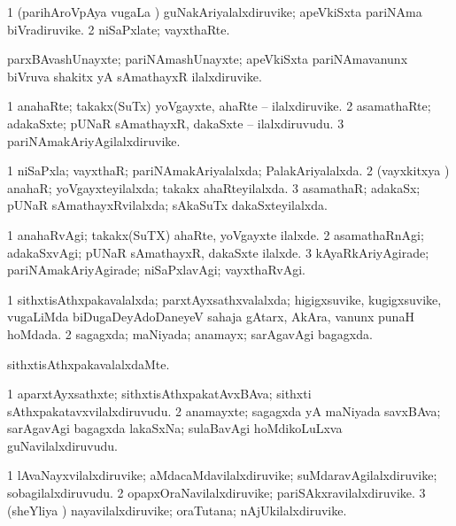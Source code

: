 \bentry
{}
\gl{\nA}
\bmng
\bnum
\num{1} (parihAroVpAya \mo vugaLa \vi) guNakAriyalalxdiruvike; apeVkiSxta pariNAma biVradiruvike. 
\num{2} niSaPxlate; vayxthaRte. 
\enum
\emng
\eentry

\bentry
{}
\gl{\nA}
\bmng
parxBAvashUnayxte; pariNAmashUnayxte; apeVkiSxta pariNAmavanunx biVruva shakitx yA sAmathayxR ilalxdiruvike. 
\emng
\eentry

\bentry
{}
\gl{\nA}
\bmng
\bnum
\num{1} anahaRte; takakx(SuTx) yoVgayxte, ahaRte -- ilalxdiruvike. 
\num{2} asamathaRte; adakaSxte; pUNaR sAmathayxR, dakaSxte -- ilalxdiruvudu. 
\num{3} pariNAmakAriyAgilalxdiruvike. 
\enum
\emng
\eentry

\bentry
{}
\gl{\gu}
\bmng
\bnum
\num{1} niSaPxla; vayxthaR; pariNAmakAriyalalxda; PalakAriyalalxda. 
\num{2} (vayxkitxya \vi) anahaR; yoVgayxteyilalxda; takakx ahaRteyilalxda. 
\num{3} asamathaR; adakaSx; pUNaR sAmathayxRvilalxda; sAkaSuTx dakaSxteyilalxda. 
\enum
\emng
\eentry

\bentry
{}
\gl{\kirxvi}
\bmng
\bnum
\num{1} anahaRvAgi; takakx(SuTX) ahaRte, yoVgayxte ilalxde. 
\num{2} asamathaRnAgi; adakaSxvAgi; pUNaR sAmathayxR, dakaSxte ilalxde. 
\num{3} kAyaRkAriyAgirade; pariNAmakAriyAgirade; niSaPxlavAgi; vayxthaRvAgi. 
\enum
\emng
\eentry

\bentry
{}
\gl{\gu}
\bmng
\bnum
\num{1} sithxtisAthxpakavalalxda; parxtAyxsathxvalalxda; higigxsuvike, kugigxsuvike, \mo vugaLiMda biDugaDeyAdoDaneyeV sahaja gAtarx, AkAra, \mo vanunx punaH hoMdada. 
\num{2} sagagxda; maNiyada; anamayx; sarAgavAgi bagagxda. 
\enum
\emng
\eentry

\bentry
{}
\gl{\kirxvi}
\bmng
sithxtisAthxpakavalalxdaMte. 
\emng
\eentry

\bentry
{}
\gl{\nA}
\bmng
\bnum
\num{1} aparxtAyxsathxte; sithxtisAthxpakatAvxBAva; sithxti sAthxpakatavxvilalxdiruvudu. 
\num{2} anamayxte; sagagxda yA maNiyada savxBAva; sarAgavAgi bagagxda lakaSxNa; sulaBavAgi hoMdikoLuLxva guNavilalxdiruvudu. 
\enum
\emng
\eentry

\bentry
{}
\gl{\nA}
\bmng
\bnum
\num{1} lAvaNayxvilalxdiruvike; aMdacaMdavilalxdiruvike; suMdaravAgilalxdiruvike; sobagilalxdiruvudu. 
\num{2} opapxOraNavilalxdiruvike; pariSAkxravilalxdiruvike. 
\num{3} (sheYliya \vi) nayavilalxdiruvike; oraTutana; nAjUkilalxdiruvike. 
\enum
\emng
\eentry

